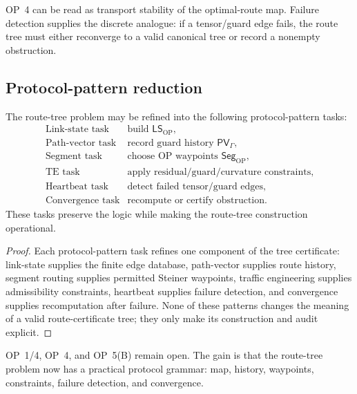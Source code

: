 \begin{remark}
\label{rem:v410r13-failure-detection-op4}
OP~4 can be read as transport stability of the optimal-route map. Failure
detection supplies the discrete analogue: if a tensor/guard edge fails, the
route tree must either reconverge to a valid canonical tree or record a
nonempty obstruction.
\end{remark}

\subsection{Protocol-pattern reduction}
\label{subsec:v410r13-protocol-pattern-reduction}

\begin{theorem}
\label{thm:v410r13-routing-protocol-pattern-reduction}
The route-tree problem may be refined into the following protocol-pattern
tasks:
\[
\begin{array}{ll}
\text{Link-state task} & \text{build }\mathsf{LS}_{\mathrm{OP}},\\
\text{Path-vector task} & \text{record guard history }\mathsf{PV}_{\Gamma},\\
\text{Segment task} & \text{choose OP waypoints }\mathsf{Seg}_{\mathrm{OP}},\\
\text{TE task} & \text{apply residual/guard/curvature constraints},\\
\text{Heartbeat task} & \text{detect failed tensor/guard edges},\\
\text{Convergence task} & \text{recompute or certify obstruction.}
\end{array}
\]
These tasks preserve the logic while making the route-tree construction
operational.
\end{theorem}

\begin{proof}
Each protocol-pattern task refines one component of the tree certificate:
link-state supplies the finite edge database, path-vector supplies route
history, segment routing supplies permitted Steiner waypoints, traffic
engineering supplies admissibility constraints, heartbeat supplies failure
detection, and convergence supplies recomputation after failure. None of these
patterns changes the meaning of a valid route-certificate tree; they only make
its construction and audit explicit.
\end{proof}

\begin{remark}
\label{rem:v410r13-op-status}
OP~1/4, OP~4, and OP~5(B) remain open. The gain is that the route-tree problem
now has a practical protocol grammar: map, history, waypoints, constraints,
failure detection, and convergence.
\end{remark}



